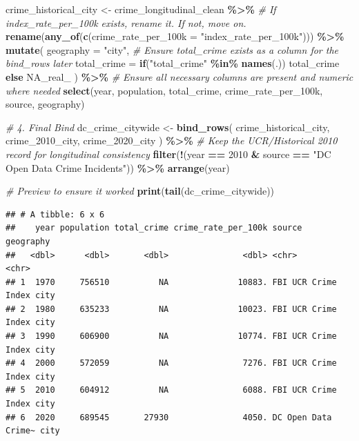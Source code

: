 \documentclass[
]{article}
\newenvironment{Shaded}{\begin{snugshade}}{\end{snugshade}}
\newcommand{\AttributeTok}[1]{\textcolor[rgb]{0.13,0.29,0.53}{#1}}
\newcommand{\CommentTok}[1]{\textcolor[rgb]{0.56,0.35,0.01}{\textit{#1}}}
\newcommand{\ConstantTok}[1]{\textcolor[rgb]{0.56,0.35,0.01}{#1}}
\newcommand{\ControlFlowTok}[1]{\textcolor[rgb]{0.13,0.29,0.53}{\textbf{#1}}}
\newcommand{\DecValTok}[1]{\textcolor[rgb]{0.00,0.00,0.81}{#1}}
\newcommand{\FunctionTok}[1]{\textcolor[rgb]{0.13,0.29,0.53}{\textbf{#1}}}
\newcommand{\NormalTok}[1]{#1}
\newcommand{\OtherTok}[1]{\textcolor[rgb]{0.56,0.35,0.01}{#1}}
\newcommand{\SpecialCharTok}[1]{\textcolor[rgb]{0.81,0.36,0.00}{\textbf{#1}}}
\newcommand{\StringTok}[1]{\textcolor[rgb]{0.31,0.60,0.02}{#1}}
\begin{document}
\begin{Shaded}
\begin{Highlighting}[]
\NormalTok{crime\_historical\_city }\OtherTok{\textless{}{-}}\NormalTok{ crime\_longitudinal\_clean }\SpecialCharTok{\%\textgreater{}\%}
 \CommentTok{\# If index\_rate\_per\_100k exists, rename it. If not, move on.}
 \FunctionTok{rename}\NormalTok{(}\FunctionTok{any\_of}\NormalTok{(}\FunctionTok{c}\NormalTok{(}\AttributeTok{crime\_rate\_per\_100k =} \StringTok{"index\_rate\_per\_100k"}\NormalTok{))) }\SpecialCharTok{\%\textgreater{}\%}
 \FunctionTok{mutate}\NormalTok{(}
 \AttributeTok{geography =} \StringTok{"city"}\NormalTok{,}
 \CommentTok{\# Ensure total\_crime exists as a column for the bind\_rows later}
\AttributeTok{total\_crime =} \ControlFlowTok{if}\NormalTok{(}\StringTok{"total\_crime"} \SpecialCharTok{\%in\%} \FunctionTok{names}\NormalTok{(.)) total\_crime }\ControlFlowTok{else} \ConstantTok{NA\_real\_}
\NormalTok{  ) }\SpecialCharTok{\%\textgreater{}\%}
 \CommentTok{\# Ensure all necessary columns are present and numeric where needed}
  \FunctionTok{select}\NormalTok{(year, population, total\_crime, crime\_rate\_per\_100k, source, geography)}

\CommentTok{\# 4. Final Bind}
\NormalTok{dc\_crime\_citywide }\OtherTok{\textless{}{-}} \FunctionTok{bind\_rows}\NormalTok{(}
\NormalTok{  crime\_historical\_city,}
\NormalTok{  crime\_2010\_city,}
\NormalTok{  crime\_2020\_city}
\NormalTok{) }\SpecialCharTok{\%\textgreater{}\%}
  \CommentTok{\# Keep the UCR/Historical 2010 record for longitudinal consistency}
  \FunctionTok{filter}\NormalTok{(}\SpecialCharTok{!}\NormalTok{(year }\SpecialCharTok{==} \DecValTok{2010} \SpecialCharTok{\&}\NormalTok{ source }\SpecialCharTok{==} \StringTok{"DC Open Data Crime Incidents"}\NormalTok{)) }\SpecialCharTok{\%\textgreater{}\%}
  \FunctionTok{arrange}\NormalTok{(year)}

\CommentTok{\# Preview to ensure it worked}
\FunctionTok{print}\NormalTok{(}\FunctionTok{tail}\NormalTok{(dc\_crime\_citywide))}
\end{Highlighting}
\end{Shaded}

\begin{verbatim}
## # A tibble: 6 x 6
##    year population total_crime crime_rate_per_100k source              geography
##   <dbl>      <dbl>       <dbl>               <dbl> <chr>               <chr>    
## 1  1970     756510          NA              10883. FBI UCR Crime Index city     
## 2  1980     635233          NA              10023. FBI UCR Crime Index city     
## 3  1990     606900          NA              10774. FBI UCR Crime Index city     
## 4  2000     572059          NA               7276. FBI UCR Crime Index city     
## 5  2010     604912          NA               6088. FBI UCR Crime Index city     
## 6  2020     689545       27930               4050. DC Open Data Crime~ city
\end{verbatim}
\end{document}
